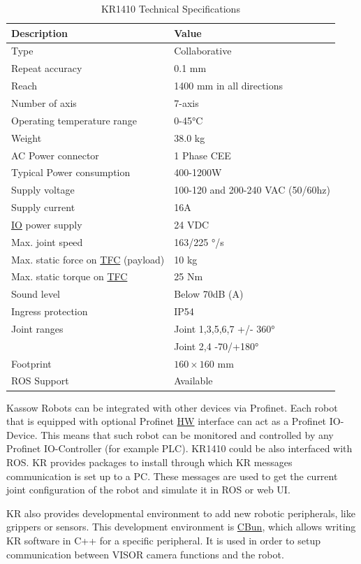 \begin{table}[h!]
    \centering
    \small
    \renewcommand{\arraystretch}{1.2} %
    \begin{tabular}{ll}
        \textbf{Description} & \textbf{Value} \\ \hline
        Type & Collaborative \\
        Repeat accuracy & 0.1 mm \\
        Reach & 1400 mm in all directions\\
        Number of axis & 7-axis \\
        Operating temperature range & 0-45°C\\ 
        Weight & 38.0 kg \\ 
        AC Power connector & 1 Phase CEE \\ 
        Typical Power consumption & 400-1200W \\ 
        Supply voltage & 100-120 and 200-240 VAC (50/60hz) \\ 
        Supply current & 16A\\ 
        \hyperref[acro:IO]{IO} power supply & 24 VDC\\ 
        Max. joint speed  & 163/225 °/s\\ 
        Max. static force on \hyperref[acro:TFC]{TFC} (payload) & 10 kg\\ 
        Max. static torque on \hyperref[acro:TFC]{TFC} & 25 Nm\\ 
        Sound level & Below 70dB (A) \\ 
        Ingress protection & IP54 \\ 
        Joint ranges & Joint 1,3,5,6,7 +/- 360° \\
        & Joint 2,4 -70/+180° \\ 
        Footprint& $160 \times 160$ mm \\ 
        ROS Support & Available \\ \hline
    \end{tabular}
    \caption{KR1410 Technical Specifications}
\end{table}


Kassow Robots can be integrated with other devices via Profinet. Each robot that is equipped with optional Profinet 
\hyperref[acro:HW]{HW} interface can act as a Profinet IO-Device.
This means that such robot can be monitored and controlled by any Profinet IO-Controller (for example PLC). \cite{profinet}
KR1410 could be also interfaced with ROS. KR provides packages to install through which KR messages communication is set up to a PC.
These messages are used to get the current joint configuration of the robot and simulate it in ROS or web UI. \cite{kassow-ros}

KR also provides developmental environment to add new robotic peripherals, like grippers or sensors. This development environment is \hyperref[acro:CBun]{CBun},
which allows writing KR software in C++ for a specific peripheral. It is used in order to setup communication between VISOR camera functions and the robot. \cite{Cbun}
